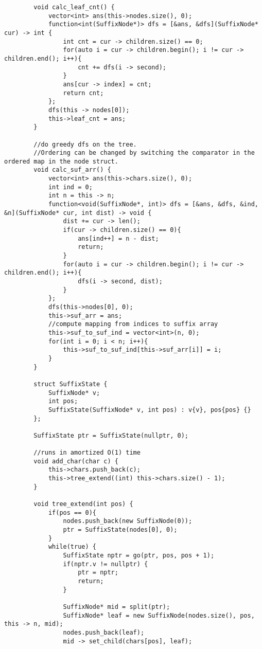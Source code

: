 \documentclass[8pt, headheight=10pt]{scrartcl}
\begin{document}
\begin{multicols*}{3}
\begin{lstlisting}
        void calc_leaf_cnt() {
            vector<int> ans(this->nodes.size(), 0);
            function<int(SuffixNode*)> dfs = [&ans, &dfs](SuffixNode* cur) -> int {
                int cnt = cur -> children.size() == 0;
                for(auto i = cur -> children.begin(); i != cur -> children.end(); i++){
                    cnt += dfs(i -> second);
                }
                ans[cur -> index] = cnt;
                return cnt;
            };
            dfs(this -> nodes[0]);
            this->leaf_cnt = ans;
        }

        //do greedy dfs on the tree. 
        //Ordering can be changed by switching the comparator in the ordered map in the node struct. 
        void calc_suf_arr() {
            vector<int> ans(this->chars.size(), 0);
            int ind = 0;
            int n = this -> n;
            function<void(SuffixNode*, int)> dfs = [&ans, &dfs, &ind, &n](SuffixNode* cur, int dist) -> void {
                dist += cur -> len();
                if(cur -> children.size() == 0){
                    ans[ind++] = n - dist;
                    return;
                }
                for(auto i = cur -> children.begin(); i != cur -> children.end(); i++){
                    dfs(i -> second, dist);
                }
            };
            dfs(this->nodes[0], 0);
            this->suf_arr = ans;
            //compute mapping from indices to suffix array
            this->suf_to_suf_ind = vector<int>(n, 0);
            for(int i = 0; i < n; i++){
                this->suf_to_suf_ind[this->suf_arr[i]] = i;
            }
        }

        struct SuffixState {
            SuffixNode* v;
            int pos;
            SuffixState(SuffixNode* v, int pos) : v{v}, pos{pos} {}
        };

        SuffixState ptr = SuffixState(nullptr, 0);

        //runs in amortized O(1) time
        void add_char(char c) {
            this->chars.push_back(c);
            this->tree_extend((int) this->chars.size() - 1);
        }

        void tree_extend(int pos) {
            if(pos == 0){
                nodes.push_back(new SuffixNode(0));
                ptr = SuffixState(nodes[0], 0);
            }
            while(true) {
                SuffixState nptr = go(ptr, pos, pos + 1);
                if(nptr.v != nullptr) {
                    ptr = nptr;
                    return;
                }

                SuffixNode* mid = split(ptr);
                SuffixNode* leaf = new SuffixNode(nodes.size(), pos, this -> n, mid);
                nodes.push_back(leaf);
                mid -> set_child(chars[pos], leaf);


\end{lstlisting}
\end{multicols*}
\end{document}
